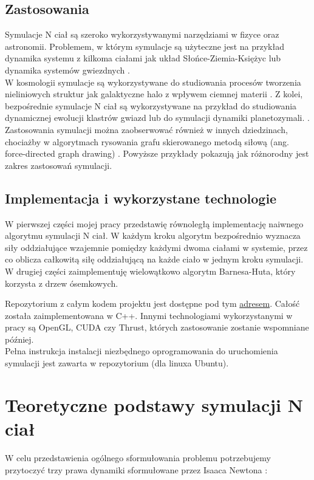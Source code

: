 \documentclass[14pt,twoside,a4paper]{article}
\theoremstyle{definition}
\begin{document}
\subsection{\Large Zastosowania}
Symulacje N ciał są szeroko wykorzystywanymi narzędziami w fizyce oraz astronomii. Problemem, w którym symulacje są użyteczne jest na przykład dynamika systemu z kilkoma ciałami jak układ Słońce-Ziemia-Księżyc \cite{SEMmisc} lub dynamika systemów gwiezdnych \cite{chaosMisc}.\\
W kosmologii symulacje są wykorzystywane do studiowania procesów tworzenia nieliniowych struktur jak galaktyczne halo z wpływem ciemnej materii \cite{haloDensity}. 
Z kolei, bezpośrednie symulacje N ciał są wykorzystywane na przykład do studiowania dynamicznej ewolucji klastrów gwiazd lub do symulacji dynamiki planetozymali. \cite{dirNBody}. Zastosowania symulacji można zaobserwować również w innych dziedzinach, chociażby w algorytmach rysowania grafu skierowanego metodą siłową (ang. force-directed graph drawing) \cite{visGraph}. Powyższe przykłady pokazują jak różnorodny jest zakres zastosowań symulacji.

\subsection{\Large Implementacja i wykorzystane technologie}
W pierwszej części mojej pracy przedstawię równoległą implementację naiwnego algorytmu symulacji N ciał. W każdym kroku algorytm bezpośrednio wyznacza siły oddziałujące wzajemnie pomiędzy każdymi dwoma ciałami w systemie, przez co oblicza całkowitą siłę oddziałującą na każde ciało w jednym kroku symulacji. W drugiej części zaimplementuję wielowątkowo algorytm Barnesa-Huta, który korzysta z drzew ósemkowych.

Repozytorium z całym kodem projektu jest dostępne pod tym \href{https://github.com/damian1996/N-Body-Simulation}{adresem}.
Całość została zaimplementowana w C++. Innymi technologiami wykorzystanymi w pracy są OpenGL, CUDA czy Thrust, których zastosowanie zostanie wspomniane później. \\
Pełna instrukcja instalacji niezbędnego oprogramowania do uruchomienia symulacji jest zawarta w repozytorium (dla linuxa Ubuntu).

\section{\LARGE Teoretyczne podstawy symulacji N ciał}

W celu przedstawienia ogólnego sformułowania problemu potrzebujemy przytoczyć trzy prawa dynamiki sformułowane przez Isaaca Newtona \cite[str.~83-84]{Principia} :
\end{document}
